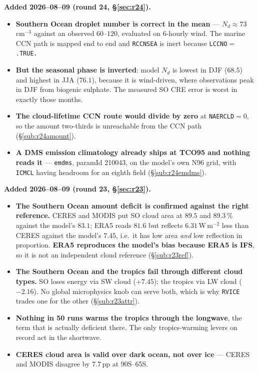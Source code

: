 \documentclass[10pt]{article}
\begin{document}
\textbf{Added 2026--08--09 (round 24, \S\ref{sec:r24}).}
\begin{itemize}\itemsep2pt
\item \textbf{Southern Ocean droplet number is correct in the mean} --- $N_d\approx73$\,cm$^{-3}$
against an observed $60$--$120$, evaluated on 6-hourly wind. The marine CCN path is
mapped end to end and \texttt{RCCNSEA} is inert because \texttt{LCCNO}$=$\texttt{.TRUE.}
\item \textbf{But the seasonal phase is inverted}: model $N_d$ is lowest in DJF ($68.5$)
and highest in JJA ($76.1$), because it is wind-driven, where observations peak in DJF from
biogenic sulphate. The measured SO CRE error is worst in exactly those months.
\item \textbf{The cloud-lifetime CCN route would divide by zero} at \texttt{NAERCLD}$=0$,
so the amount two-thirds is unreachable from the CCN path (\S\ref{sub:r24amount}).
\item \textbf{A DMS emission climatology already ships at TCO95 and nothing reads it} ---
\texttt{emdms}, paramId 210043, on the model's own N96 grid, with \texttt{ICMCL} having
headroom for an eighth field (\S\ref{sub:r24emdms}).
\end{itemize}

\textbf{Added 2026--08--09 (round 23, \S\ref{sec:r23}).}
\begin{itemize}\itemsep2pt
\item \textbf{The Southern Ocean amount deficit is confirmed against the right reference.}
CERES and MODIS put SO cloud area at $89.5$ and $89.3\,\%$ against the model's $83.1$; ERA5
reads $81.6$ but reflects $6.31$\,W\,m$^{-2}$ less than CERES against the model's $7.45$, i.e.\
it has low area \emph{and} low reflection in proportion. \textbf{ERA5 reproduces the model's
bias because ERA5 is IFS}, so it is not an independent cloud reference (\S\ref{sub:r23ref}).
\item \textbf{The Southern Ocean and the tropics fail through different cloud types.} SO loses
energy via SW cloud ($+7.45$); the tropics via LW cloud ($-2.16$). No global microphysics knob
can serve both, which is why \texttt{RVICE} trades one for the other (\S\ref{sub:r23attr}).
\item \textbf{Nothing in 50 runs warms the tropics through the longwave}, the term that is
actually deficient there. The only tropics-warming levers on record act in the shortwave.
\item \textbf{CERES cloud area is valid over dark ocean, not over ice} --- CERES and MODIS
disagree by $7.7$\,pp at 90S--65S.
\end{itemize}
\end{document}
